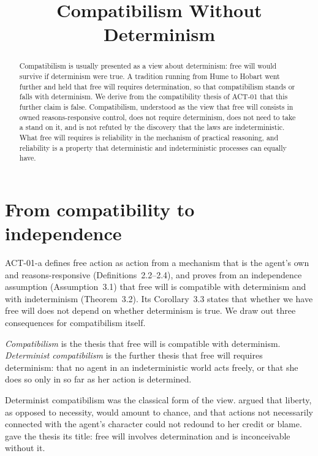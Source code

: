 \documentclass{situationist-preprint}
\title{Compatibilism Without Determinism}
\begin{document}
\maketitle

\begin{abstract}
Compatibilism is usually presented as a view about determinism: free will would survive if determinism were true. A tradition running from Hume to Hobart went further and held that free will requires determination, so that compatibilism stands or falls with determinism. We derive from the compatibility thesis of ACT-01 that this further claim is false. Compatibilism, understood as the view that free will consists in owned reasons-responsive control, does not require determinism, does not need to take a stand on it, and is not refuted by the discovery that the laws are indeterministic. What free will requires is reliability in the mechanism of practical reasoning, and reliability is a property that deterministic and indeterministic processes can equally have.
\end{abstract}

\section{From compatibility to independence}

ACT-01-a defines free action as action from a mechanism that is the agent's own and reasons-responsive (Definitions~2.2--2.4), and proves from an independence assumption (Assumption~3.1) that free will is compatible with determinism and with indeterminism (Theorem~3.2). Its Corollary~3.3 states that whether we have free will does not depend on whether determinism is true. We draw out three consequences for compatibilism itself.

\begin{definition}\label{d:comp}
\emph{Compatibilism} is the thesis that free will is compatible with determinism. \emph{Determinist compatibilism} is the further thesis that free will requires determinism: that no agent in an indeterministic world acts freely, or that she does so only in so far as her action is determined.
\end{definition}

Determinist compatibilism was the classical form of the view. \citet[\S VIII]{Hume1748} argued that liberty, as opposed to necessity, would amount to chance, and that actions not necessarily connected with the agent's character could not redound to her credit or blame. \citet{Hobart1934} gave the thesis its title: free will involves determination and is inconceivable without it.
\end{document}
